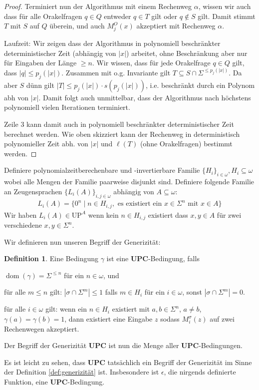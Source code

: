 \documentclass[nofonts]{uebung}
\theoremstyle{definition}
\newtheorem{definition}[theorem]{Definition}
\def\UP{\ensuremath{\mathrm{UP}}}
\DeclareMathOperator{\dom}{dom}
\begin{document}
\begin{proof}
    Terminiert nun der Algorithmus mit einem Rechenweg $\alpha$, wissen wir auch dass für alle Orakelfragen $q\in Q$ entweder $q\in T$ gilt oder $q\not\in S$ gilt.
    Damit stimmt $T$ mit $S$ auf $Q$ überein, und auch $M_j^O(x)$ akzeptiert mit Rechenweg $\alpha$.

    Laufzeit: Wir zeigen dass der Algorithmus in polynomiell beschränkter deterministischer Zeit (abhängig von $|x|$) arbeitet, ohne Beschränkung aber nur für Eingaben der Länge $\geq n$.
    Wir wissen, dass für jede Orakelfrage $q\in Q$ gilt, dass $|q|\leq p_j(|x|)$.
    Zusammen mit o.g. Invariante gilt $T\subseteq S\cap\Sigma^{\leq p_j(|x|)}$.
    Da aber $S$ dünn gilt $|T|\leq p_j(|x|)\cdot s(p_j(|x|))$, i.e. beschränkt durch ein Polynom abh von $|x|$.
    Damit folgt auch unmittelbar, dass der Algorithmus nach höchstens polynomiell vielen Iterationen terminiert.

    Zeile 3 kann damit auch in polynomiell beschränkter deterministischer Zeit berechnet werden. Wie oben skizziert kann der Rechenweg in deterministisch polynomieller Zeit abh. von $|x|$ und $\ell(T)$ (ohne Orakelfragen) bestimmt werden.
\end{proof}

Definiere polynomialzeitberechenbare und -invertierbare Familie $\{H_{i}\}_{i\in\omega}, H_i\subseteq\omega$ wobei
alle Mengen der Familie paarweise disjunkt sind.
Definiere folgende Familie an Zeugensprachen $\{L_{i}(A) \}_{i,j\in\omega}$ abhängig von $A\subseteq\omega$:
\begin{gather*}
    L_{i}(A) = \{ 0^n \mid n\in H_{i,j}, \text{ es existiert ein $x\in\Sigma^n$ mit $x\in A$} \}
\end{gather*}
Wir haben $L_{i}(A)\in\UP^A$ wenn kein $n\in H_{i,j}$ existiert dass $x, y\in A$ für zwei verschiedene $x,y\in\Sigma^n$.

Wir definieren nun unseren Begriff der Generizität:
\begin{definition}
    Eine Bedingung $\gamma$ ist eine $\mathbf{UPC}$-Bedingung, falls
    \begin{thmenum}
        \item $\dom(\gamma)=\Sigma^{\leq n}$ für ein $n\in\omega$, und
        \item\label{def:upc-sparsity} für alle $m\leq n$ gilt: $|\sigma\cap\Sigma^m|\leq 1$ falls $m\in H_i$ für ein $i\in\omega$, sonst $|\sigma\cap\Sigma^m|=0$.
        \item\label{def:upc-generizität-zeugensprache} für alle $i\in\omega$ gilt: wenn ein $n\in H_i$ existiert mit $a,b\in\Sigma^n$, $a\neq b$, $\gamma(a)=\gamma(b)=1$, dann existiert eine Eingabe $z$ sodass $M_i^\sigma(z)$ auf zwei Rechenwegen akzeptiert.
    \end{thmenum}
    Der Begriff der Generizität $\mathbf{UPC}$ ist nun die Menge aller $\mathbf{UPC}$-Bedingungen.
\end{definition}
Es ist leicht zu sehen, dass $\mathbf{UPC}$ tatsächlich ein Begriff der Generizität im Sinne der Definition \ref{def:generizität} ist.
Insbesondere ist $\epsilon$, die nirgends definierte Funktion, eine $\mathbf{UPC}$-Bedingung.
\end{document}
